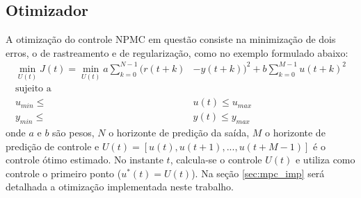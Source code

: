 \subsection{Otimizador}
A otimização do controle NPMC em questão consiste na minimização de dois erros, o de rastreamento e de regularização, como no exemplo formulado abaixo:
\begin{align}
    \min_{U(t)} J(t) = \min_{U(t)} a \sum_{k=0}^{N-1}(r(t+k)&-y(t+k))^2 + b \sum_{k=0}^{M-1}u(t+k)^2 \\
    \text{sujeito a} \;\;\;\;& \\
    u_{min} \leq &u(t) \leq u_{max} \\
    y_{min} \leq &y(t) \leq y_{max}
\end{align}
onde $a$ e $b$ são pesos, $N$ o horizonte de predição da saída, $M$ o horizonte de predição de controle e $U(t)=[u(t), u(t+1), ..., u(t+M-1)]$ é o controle ótimo estimado. No instante $t$, calcula-se o controle $U(t)$ e utiliza como controle o primeiro ponto ($u^*(t) = U(t)$). Na seção \ref{sec:mpc_imp} será detalhada a otimização implementada neste trabalho.